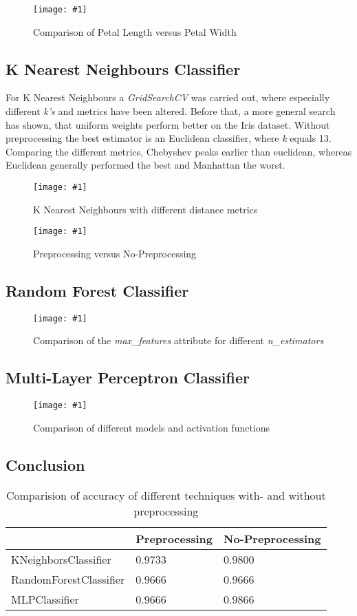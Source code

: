 \documentclass{article}
\newcommand{\size}{0.9\textwidth}
\newcommand{\image}[3]{
\begin{figure}
\begin{center}
\texttt{[image: \#1]}
\caption{#2}
#3
\end{center}
\end{figure}
}
\begin{document}
\image{plots/petal.png}{Comparison of Petal Length versus Petal Width}{\label{fig:petal}}

\subsection{K Nearest Neighbours Classifier}
For K Nearest Neighbours a \textit{GridSearchCV} was carried out, where especially different \textit{k's} and metrics have been altered. Before that, a more general search has shown, that uniform weights perform better on the Iris dataset. Without preprocessing the best estimator is an Euclidean classifier, where \textit{k} equals 13. Comparing the different metrics, Chebyshev peaks earlier than euclidean, whereas Euclidean generally performed the best and Manhattan the worst. 

\image{plots/knn_np_comparision.png}{K Nearest Neighbours with different distance metrics}{\label{fig:knn_comp}}
\image{plots/knn_np_p_comparision.png}{Preprocessing versus No-Preprocessing}{\label{prepro}}

\subsection{Random Forest Classifier}
\image{plots/rf_np_comparision.png}{Comparison of the \textit{max\_features} attribute for different \textit{n\_estimators}}{\label{rf}}

\subsection{Multi-Layer Perceptron Classifier}
\image{plots/mlp_np_comparision.png}{Comparison of different models and activation functions}{\label{mlp}}

\subsection{Conclusion}

\begin{table}[h]
\begin{center}
\begin{tabular}{|l|l|l|}
\hline
                       & Preprocessing & No-Preprocessing \\ \hline
KNeighborsClassifier   & 0.9733        & 0.9800           \\ \hline
RandomForestClassifier & 0.9666        & 0.9666           \\ \hline
MLPClassifier          & 0.9666        & 0.9866           \\ \hline
\end{tabular}
\caption{Comparision of accuracy of different techniques with- and without preprocessing}
\end{center}
\end{table}
\end{document}
